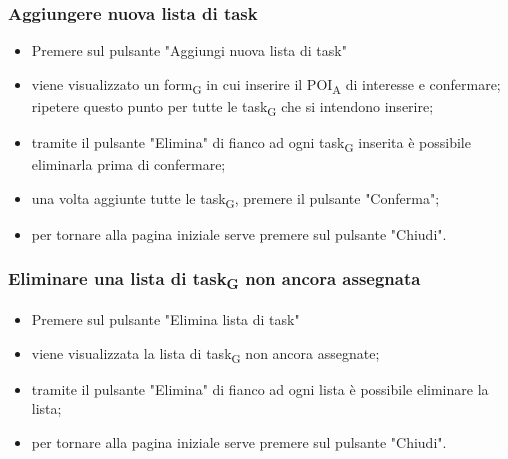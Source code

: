 \subsubsection{Aggiungere nuova lista di task}
\begin{itemize}
    \item Premere sul pulsante "Aggiungi nuova lista di task"
    \item viene visualizzato un form\textsubscript{G} in cui inserire il POI\textsubscript{A} di interesse e confermare; \\ripetere questo punto per tutte le task\textsubscript{G} che si intendono inserire;
    \item tramite il pulsante "Elimina" di fianco ad ogni task\textsubscript{G} inserita è possibile eliminarla prima di confermare;
    \item una volta aggiunte tutte le task\textsubscript{G}, premere il pulsante "Conferma";
    \item per tornare alla pagina iniziale serve premere sul pulsante "Chiudi".
\end{itemize}
\subsubsection{Eliminare una lista di task\textsubscript{G} non ancora assegnata}
\begin{itemize}
    \item Premere sul pulsante "Elimina lista di task"
    \item viene visualizzata la lista di task\textsubscript{G} non ancora assegnate;
    \item tramite il pulsante "Elimina" di fianco ad ogni lista è possibile eliminare la lista;
    \item per tornare alla pagina iniziale serve premere sul pulsante "Chiudi".
\end{itemize}